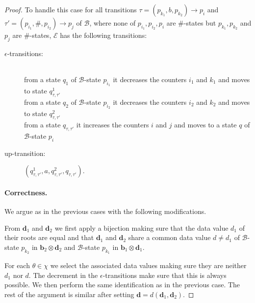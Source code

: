 \documentclass{CSML}
\newcommand\ra{\ensuremath{\rightarrow}}
\newcommand\Ba{\mathcal{B}}
\newcommand\Ea{\mathcal{E}}
\newcommand\btree{\boldsymbol{b}}
\newcommand\dtree{\boldsymbol{d}}
\begin{document}
\begin{proof}
\noindent
To handle this case for all transitions $\tau=(p_{k_1},b,p_{k_2}) \ra p_{i}$
and $\tau'=(p_{i_1},\#,p_{i_2})\ra p_j$ of
$\Ba$, where none of $p_{i_1},p_{i_2}, p_i$ are $\#$-states but
$p_{k_1},p_{k_2}$ and $p_j$  are $\#$-states, $\Ea$ has the following transitions:
\begin{description}
\item[\rm $\epsilon$-transitions:]\quad\\
from a state $q_1$ of $\Ba$-state $p_{i_1}$ 
it decreases the counters $i_1$ and $k_1$ 
and moves to state $q_{\tau,\tau'}^1$\\
from a state $q_2$ of $\Ba$-state $p_{i_2}$ it
decreases the counters $i_2$ and $k_2$ 
and moves to state $q_{\tau,\tau'}^2$\\
from a state $q_{\tau,\tau'}$ 
it increases the counters $i$ and $j$ 
and moves to a state $q$ of $\Ba$-state $p_i$

\item[\rm up-transition:]
$(q_{\tau,\tau'}^1,a,q_{\tau,\tau'}^2,q_{\tau,\tau'})$.
\end{description}

\paragraph{\bf Correctness.}  
We argue as in the previous cases with the following modifications.

From $\dtree_1$ and $\dtree_2$ we first apply a bijection making sure that the
data value $d_1$ of their roots are equal and that $\dtree_1$ and $\dtree_2$ share a common
data value $d\neq d_1$ of $\Ba$-state $p_{k_2}$ in $\btree_2 \otimes\dtree_2$ 
and $\Ba$-state $p_{k_1}$ in $\btree_1 \otimes \dtree_1$.

For each $\theta \in \chi$ we select the associated data values making sure
they are neither $d_1$ nor $d$. The decrement in the $\epsilon$-transitions make sure
that this is always possible. We then perform the same identification as in the
previous case. 
The rest of the argument is similar after setting $\dtree=d(\dtree_1,\dtree_2)$.


\end{proof}
\end{document}
